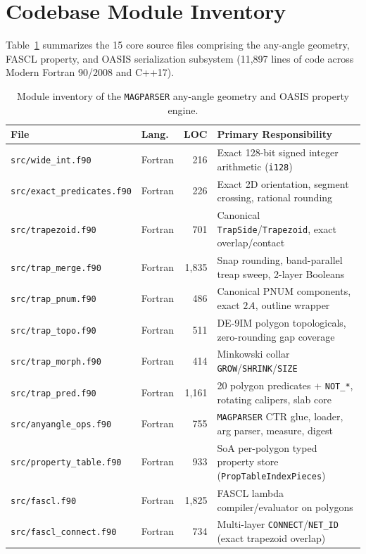 \section{Codebase Module Inventory}

Table~\ref{tab:inventory} summarizes the 15 core source files comprising the any-angle geometry, FASCL property, and OASIS serialization subsystem (11,897 lines of code across Modern Fortran 90/2008 and C++17).

\begin{table}[htbp]
\centering
\caption{Module inventory of the \texttt{MAGPARSER} any-angle geometry and OASIS property engine.}
\label{tab:inventory}
\small
\begin{tabular}{@{}llrl@{}}
\toprule
\textbf{File} & \textbf{Lang.} & \textbf{LOC} & \textbf{Primary Responsibility} \\
\midrule
\texttt{src/wide\_int.f90} & Fortran & 216 & Exact 128-bit signed integer arithmetic (\texttt{i128}) \\
\texttt{src/exact\_predicates.f90} & Fortran & 226 & Exact 2D orientation, segment crossing, rational rounding \\
\texttt{src/trapezoid.f90} & Fortran & 701 & Canonical \texttt{TrapSide}/\texttt{Trapezoid}, exact overlap/contact \\
\texttt{src/trap\_merge.f90} & Fortran & 1,835 & Snap rounding, band-parallel treap sweep, 2-layer Booleans \\
\texttt{src/trap\_pnum.f90} & Fortran & 486 & Canonical PNUM components, exact $2A$, outline wrapper \\
\texttt{src/trap\_topo.f90} & Fortran & 511 & DE-9IM polygon topologicals, zero-rounding gap coverage \\
\texttt{src/trap\_morph.f90} & Fortran & 414 & Minkowski collar \texttt{GROW}/\texttt{SHRINK}/\texttt{SIZE} \\
\texttt{src/trap\_pred.f90} & Fortran & 1,161 & 20 polygon predicates + \texttt{NOT\_*}, rotating calipers, slab core \\
\texttt{src/anyangle\_ops.f90} & Fortran & 755 & \texttt{MAGPARSER} CTR glue, loader, arg parser, measure, digest \\
\texttt{src/property\_table.f90} & Fortran & 933 & SoA per-polygon typed property store (\texttt{PropTableIndexPieces}) \\
\texttt{src/fascl.f90} & Fortran & 1,825 & FASCL lambda compiler/evaluator on polygons \\
\texttt{src/fascl\_connect.f90} & Fortran & 734 & Multi-layer \texttt{CONNECT}/\texttt{NET\_ID} (exact trapezoid overlap) \\

\end{tabular}
\end{table}
